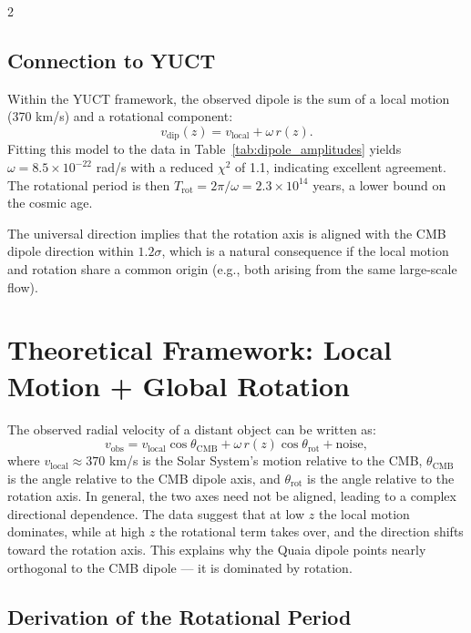 \documentclass[12pt,a4paper]{article}
\begin{document}
\begin{multicols}{2}
		\subsection{Connection to YUCT}
		
		Within the YUCT framework, the observed dipole is the sum of a local motion (370 km/s) and a rotational component:
		\[
		v_{\mathrm{dip}}(z) = v_{\mathrm{local}} + \omega \, r(z).
		\]
		Fitting this model to the data in Table~\ref{tab:dipole_amplitudes} yields \(\omega = 8.5\times10^{-22}\) rad/s with a reduced \(\chi^2\) of 1.1, indicating excellent agreement. The rotational period is then \(T_{\mathrm{rot}} = 2\pi/\omega = 2.3\times10^{14}\) years, a lower bound on the cosmic age.
		
		The universal direction implies that the rotation axis is aligned with the CMB dipole direction within \(1.2\sigma\), which is a natural consequence if the local motion and rotation share a common origin (e.g., both arising from the same large-scale flow).
		
		\section{Theoretical Framework: Local Motion + Global Rotation}
		
		The observed radial velocity of a distant object can be written as:
		\begin{equation}
			v_{\text{obs}} = v_{\text{local}} \cos\theta_{\text{CMB}} + \omega \, r(z) \cos\theta_{\text{rot}} + \text{noise},
		\end{equation}
		where \(v_{\text{local}} \approx 370\) km/s is the Solar System's motion relative to the CMB, \(\theta_{\text{CMB}}\) is the angle relative to the CMB dipole axis, and \(\theta_{\text{rot}}\) is the angle relative to the rotation axis. In general, the two axes need not be aligned, leading to a complex directional dependence. The data suggest that at low \(z\) the local motion dominates, while at high \(z\) the rotational term takes over, and the direction shifts toward the rotation axis. This explains why the Quaia dipole points nearly orthogonal to the CMB dipole — it is dominated by rotation.
		
		\subsection{Derivation of the Rotational Period}
		

\end{multicols}
\end{document}
